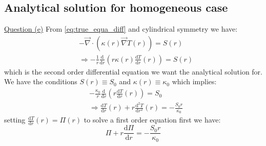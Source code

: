 \subsection{Analytical solution for homogeneous case}
\label{sec:solution_anal}
\underline{Question (e)}
From \autoref{eq:true_equa_diff} and cylindrical symmetry we have:
\begin{equation}
    \begin{aligned}
        & -\vec{\nabla} \cdot (\kappa(r)\vec{\nabla}T(r)) = S(r) \\
        & \Rightarrow -\frac{1}{r}\frac{\mathrm{d}}{\mathrm{d} r}\left(r \kappa(r) \frac{\mathrm{d}T}{\mathrm{d}r}(r)\right) = S(r)
    \end{aligned}
\end{equation}
which is the second order differential equation we want the analytical solution for. We have the conditions $S(r) \equiv S_0$ and $\kappa(r) \equiv \kappa_0$ which implies:
\begin{equation}
    \begin{aligned}
        & -\frac{\kappa_0}{r}\frac{\mathrm{d}}{\mathrm{d}r}\left(r\frac{\mathrm{d}T}{\mathrm{d}r}(r)\right) = S_0 \\
        & \Rightarrow \frac{\mathrm{d}T}{\mathrm{d}r}(r) + r\frac{\mathrm{d}^2T}{\mathrm{d}r^2}(r) = -\frac{S_0 r}{\kappa_0}
    \end{aligned}
\end{equation}
setting $\frac{\mathrm{d}T}{\mathrm{d}r}(r) = \Pi(r)$ to solve a first order equation first we have:
\begin{equation}
    \Pi + r\frac{\mathrm{d}\Pi}{\mathrm{d}r} = -\frac{S_0 r}{\kappa_0}
    \label{eq:first_order_ode}
\end{equation}

